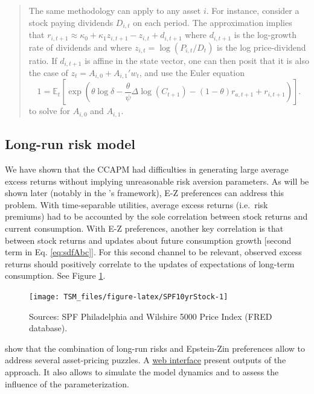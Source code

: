 \documentclass[
  12pt,
]{book}
\theoremstyle{definition}
\theoremstyle{definition}
\theoremstyle{definition}
\theoremstyle{definition}
\theoremstyle{remark}
\begin{document}
\begin{quote}
The same methodology can apply to any asset \(i\). For instance, consider a stock paying dividends \(D_{i,t}\) on each period. The \citet{Campbell_Shiller_1988} approximation implies that \(r_{i,t+1} \approx \kappa_0 + \kappa_1 z_{i,t+1} - z_{i,t} + d_{i,t+1}\) where \(d_{i,t+1}\) is the log-growth rate of dividends and where \(z_{i,t} = \log(P_{i,t}/D_t)\) is the log price-dividend ratio. If \(d_{i,t+1}\) is affine in the state vector, one can then posit that it is also the case of \(z_t= A_{i,0}+A_{i,1}'w_t\), and use the Euler equation
\begin{equation}
1 = \mathbb{E}_t \left[ \exp\left(\theta \log \delta - \frac{\theta}{\psi} \Delta \log(C_{t+1}) - (1 - \theta) r_{a,t+1} + r_{i,t+1} \right) \right].\label{eq:sdfRi}
\end{equation}
to solve for \(A_{i,0}\) and \(A_{i,1}\).
\end{quote}

\hypertarget{long-run-risk-model}{%
\subsection{Long-run risk model}\label{long-run-risk-model}}

We have shown that the CCAPM had difficulties in generating large average excess returns without implying unreasonable risk aversion parameters.
As will be shown later (notably in the \citet{Bansal_Yaron_2004}'s framework), E-Z preferences can address this problem.
With time-separable utilities, average excess returns (i.e.~risk premiums) had to be accounted by the sole correlation between stock returns and current consumption.
With E-Z preferences, another key correlation is that between stock returns and updates about future consumption growth {[}second term in Eq. \eqref{eq:sdfAbc}{]}.
For this second channel to be relevant, observed excess returns should positively correlate to the updates of expectations of long-term consumption. See Figure \ref{fig:SPF10yrStock}.

\begin{figure}
\texttt{[image: TSM\_files/figure-latex/SPF10yrStock-1]} \caption{Sources: SPF Philadelphia and Wilshire 5000 Price Index (FRED database).}\label{fig:SPF10yrStock}
\end{figure}

\citet{Bansal_Yaron_2004} show that the combination of long-run risks and Epstein-Zin preferences allow to address several asset-pricing puzzles. A \href{https://jrenne.shinyapps.io/LRRModels}{web interface} present outputs of the approach. It also allows to simulate the model dynamics and to assess the influence of the parameterization.
\end{document}
